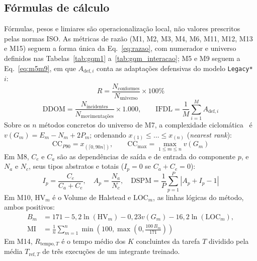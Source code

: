 \documentclass[conference]{model/IEEEtran}%
\begin{document}
\subsection{Fórmulas de cálculo}\label{sec:formulas}
Fórmulas, pesos e limiares são operacionalização local, não valores prescritos pelas normas ISO. As métricas de razão (M1, M2, M3, M4, M6, M11, M12, M13 e M15) seguem a forma única da Eq.~\ref{eq:razao}, com numerador e universo definidos nas Tabelas~\ref{tab:gqm1} a~\ref{tab:gqm_interacao}; M5 e M9 seguem a Eq.~\ref{eq:m5m9}, em que $A_{\text{def},i}$ conta as adaptações defensivas do modelo \texttt{Legacy*} $i$:
\begin{equation}\label{eq:razao}
R = \frac{N_{\text{conformes}}}{N_{\text{universo}}} \times 100\%
\end{equation}
\begin{equation}\label{eq:m5m9}
\text{DDOM} = \frac{N_{\text{incidentes}}}{N_{\text{movimentações}}} \times 1.000, \qquad
\text{IFDL} = \frac{1}{M}\sum_{i=1}^{M} A_{\text{def},i}
\end{equation}
Sobre os $n$ métodos concretos do universo de M7, a complexidade ciclomática~\cite{mccabe1996structured} é $v(G_m) = E_m - N_m + 2P_m$; ordenando $x_{(1)} \le \dots \le x_{(n)}$ (\textit{nearest rank}):
\begin{equation}\label{eq:m7}
\text{CC}_{P90} = x_{(\lceil 0{,}90n \rceil)}, \qquad \text{CC}_{\max} = \max_{1 \le m \le n} v(G_m)
\end{equation}
Em M8, $C_e$ e $C_a$ são as dependências de saída e de entrada do componente $p$, e $N_a$ e $N_c$, seus tipos abstratos e totais ($I_p=0$ se $C_a+C_e=0$):
\begin{equation}\label{eq:m8}
I_p = \frac{C_e}{C_a + C_e}, \quad A_p = \frac{N_a}{N_c}, \quad
\text{DSPM} = \frac{1}{P} \sum_{p=1}^{P} |A_p + I_p - 1|
\end{equation}
Em M10, $\text{HV}_m$ é o Volume de Halstead e $\text{LOC}_m$, as linhas lógicas do método, ambos positivos:
\begin{equation}\label{eq:m10}
\begin{aligned}
B_m &= 171 - 5{,}2\ln(\text{HV}_m) - 0{,}23v(G_m) - 16{,}2\ln(\text{LOC}_m), \\
\text{MI} &= \frac{1}{n}\sum_{m=1}^{n}\min\!\left(100,\max\!\left(0,\frac{100\,B_m}{171}\right)\right)
\end{aligned}
\end{equation}
Em M14, $R_{\text{tempo},T}$ é o tempo médio dos $K$ concluintes da tarefa $T$ dividido pela média $T_{\text{ref},T}$ de três execuções de um integrante treinado.
\end{document}
